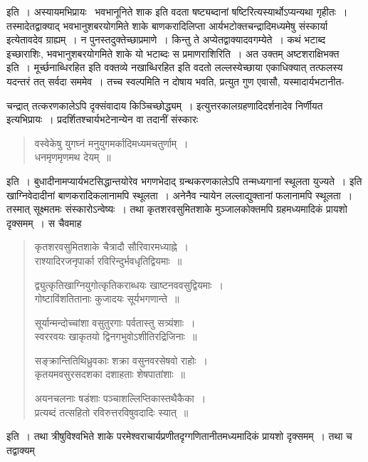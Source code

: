 \documentclass[11pt, openany]{book}
\begin{document}
\noindent इति~। अस्यायमभिप्रायः \textendash\ भवभानूनिते शाक इति वदता {\qt षष्ट्यब्दानां षष्टि}रित्यस्यार्थोऽप्यन्यथा गृहीतः~। तस्मादेतद्वाक्याद् भवभानुशबरयोगमिते शाके बाणकरादिलिप्ता आर्यभटोक्तचन्द्रादिमध्यमेषु संस्कार्या इत्येतावदेव ग्राह्यम्~। न पुनस्तदुक्तेच्छाप्रमाणे~। किन्तु ते अप्येतद्वाक्यादवगम्येते~। कथं भटाब्द इच्छाराशिः, भवभानुशबरयोगमिते शाके यो भटाब्दः स प्रमाणराशिरिति~। अत उक्तम् {\qt अष्टशराक्षिभक्त} इति~। मूर्च्छनाब्धिरहित इति वक्तव्ये {\qt नखाब्धिरहित} इति वदतो लल्लस्येच्छाया एकाधिक्यात् तत्फलस्य यदन्तरं तत् सर्वदा सममेव~। तच्च स्वल्पमिति न दोषाय भवति, प्रत्युत गुण एवासौ, यस्मादार्यभटानीत-


\newpage

\noindent चन्द्रात् तत्करणकालेऽपि दृक्संवादाय किञ्चिच्छोद्ध्यम्~। इत्युत्तरकालग्रहणादिदर्शनादेव निर्णीयत इत्यभिप्रायः~। प्रदर्शितश्चार्यभटेनान्येन वा तदानीं संस्कारः\textendash 
\begin{quote}
{\qt वस्वेकेषु युगघ्नं मनुयुगमर्कादिमध्यमचतुर्णाम्~।\\
धनमृणमृणमथ देयम्~॥}
\end{quote}

\noindent इति~। बुधादीनामप्यार्यभटसिद्धान्तयोरेव भगणभेदाद् ग्रन्थकरणकालेऽपि तन्मध्यगानां स्थूलता युज्यते~। इति खाग्निवेदादीनां बाणकरादिकलानामपि स्थूलता~। अनेनैव न्यायेन लल्लाद्युक्तानां फलानामपि स्थूलता~। तस्मात् सूक्ष्मतमः संस्कारोऽन्वेष्यः~। तथा कृतशरवसुमितशाके मुञ्जालकोक्तमपि ग्रहमध्यमादिकं प्रायशो दृक्समम्~। स चैवमाह\textendash 

\begin{quote}
{\qt कृतशरवसुमितशाके चैत्रादौ सौरिवारमध्याह्ने~।\\
 राश्यादिरजनृपार्का रविरिन्दुर्भवधृतिद्वियमाः~॥
	
द्व्युत्कृतिखाग्नियुगोत्कृतिकराब्धयः खाष्टनववसुद्वियमाः~।\\
गोष्टाविंशतितानाः कुजादयः सूर्यभगणान्ते~॥
	
सूर्यान्मन्दोच्चांशा वसुतुरगाः पर्वतास्तु सत्र्यंशाः~।\\
स्वररवयः खाकृतयो द्विनगभुवोऽशीतिरद्रिजिनाः~॥
	
सङ्क्रान्तितिथिध्रुवकाः शक्रा वसुनवरसेषवो राहोः~।\\
कृतयमवसुरसदशका दशाहताः शेषपातांशाः~॥
	
अयनचलनाः षडंशाः पञ्चाशल्लिप्तिकास्तथैकैका~।\\
प्रत्यब्दं तत्सहितो रविरुत्तरविषुवदादिः स्यात्~॥}
\end{quote}

\noindent इति~। तथा त्रीषुविश्वभिते शाके परमेश्वराचार्यप्रणीतदृग्गणितानीतमध्यमादिकं प्रायशो दृक्समम्~। तथा च तद्वाक्यम्\textendash 
\end{document}
